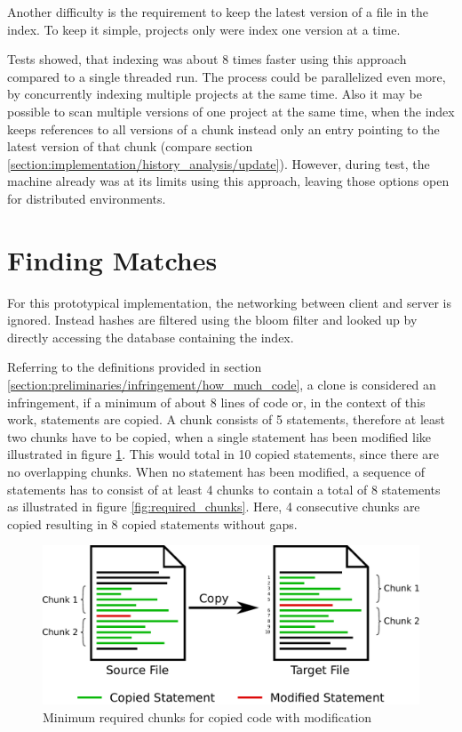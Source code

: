 Another difficulty is the requirement to keep the latest version of a file in the index.
To keep it simple, projects only were index one version at a time.

Tests showed, that indexing was about 8 times faster using this approach compared to a single threaded run.
The process could be parallelized even more, by concurrently indexing multiple projects at the same time.
Also it may be possible to scan multiple versions of one project at the same time, when the index keeps  references to all versions of a chunk instead only an entry pointing to the latest version of that chunk (compare section \ref{section:implementation/history_analysis/update}).
However, during test, the machine already was at its limits using this approach, leaving those options open for distributed environments.

\section{Finding Matches}\label{section:implementation/finding_matches}
For this prototypical implementation, the networking between client and server is ignored.
Instead hashes are filtered using the bloom filter and looked up by directly accessing the database containing the index.

Referring to the definitions provided in section \ref{section:preliminaries/infringement/how_much_code}, a clone is considered an infringement, if a minimum of about 8 lines of code or, in the context of this work, statements are copied.
A chunk consists of 5 statements, therefore at least two chunks have to be copied, when a single statement has been modified like illustrated in figure \ref{fig:required_chunks_modified}.
This would total in 10 copied statements, since there are no overlapping chunks.
When no statement has been modified, a sequence of statements has to consist of at least 4 chunks to contain a total of 8 statements as illustrated in figure \ref{fig:required_chunks}.
Here, 4 consecutive chunks are copied resulting in 8 copied statements without gaps.

\begin{figure}[h]
	\centering
	\includegraphics[width=0.9\linewidth]{figures/required_chunks_modified.pdf}
	\caption{Minimum required chunks for copied code with modification}\label{fig:required_chunks_modified}
\end{figure}


